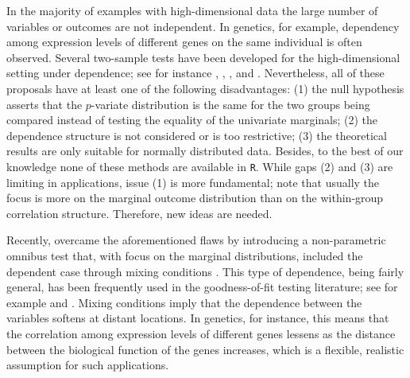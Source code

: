 In the majority of examples with high-dimensional data the large number of variables or
outcomes are not independent. In genetics, for example, dependency among expression levels of different
genes on the same individual is often observed.
Several two-sample tests have been developed for the high-dimensional setting under dependence; see for instance \cite{BiswasG}, \cite{Mondal}, \cite{Biswaset}, \cite{Liu} and \cite{Wei}. Nevertheless, all of these proposals have at least one of the following disadvantages: (1) the null hypothesis asserts that the $p$-variate distribution is the same
for the two groups being compared instead of testing the equality of
the univariate marginals; (2) the  dependence structure is not considered or is too restrictive; (3) the theoretical results are only suitable for normally distributed data. Besides, to the best of our knowledge none of these methods are available in \texttt{R}. While gaps (2) and (3) are limiting in applications, issue (1) is more fundamental; note that usually the focus is more on the marginal outcome distribution than on the within-group correlation structure. Therefore, new ideas are needed.






Recently, \cite{Marta2} overcame the aforementioned flaws by introducing a non-parametric omnibus test that, with focus on the marginal distributions, included the dependent case through mixing conditions \citep{Doukhan}. This type of dependence, being fairly general, has been frequently used in
the goodness-of-fit testing literature; see for example \cite{Neu} and
\cite{Deh15}. Mixing conditions imply that the dependence between the variables softens at distant locations. In genetics, for instance, this means that the correlation among expression levels of different genes 
lessens as the distance between the biological function of the genes
increases, which is a flexible, realistic assumption for such applications.

